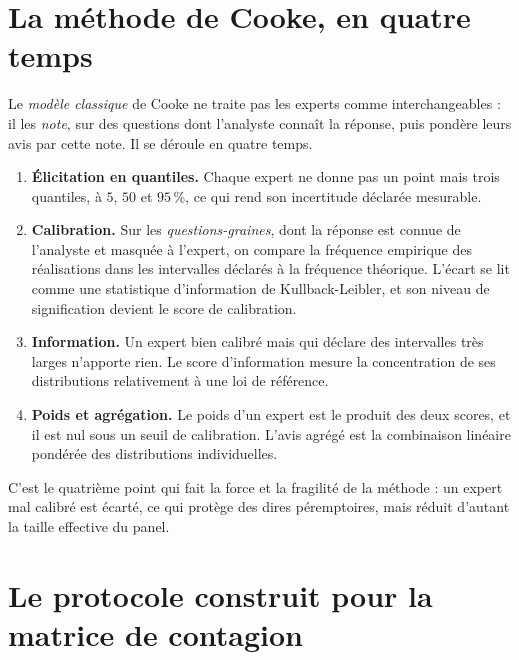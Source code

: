 \section{La méthode de Cooke, en quatre temps}


Le \emph{modèle classique} de Cooke ne traite pas les experts comme interchangeables : il les
\emph{note}, sur des questions dont l'analyste connaît la réponse, puis pondère leurs avis par
cette note. Il se déroule en quatre temps.

\begin{enumerate}[itemsep=3pt,topsep=3pt]
\item \textbf{Élicitation en quantiles.} Chaque expert ne donne pas un point mais trois
      quantiles, à $5$, $50$ et $95\,\%$, ce qui rend son incertitude déclarée mesurable.
\item \textbf{Calibration.} Sur les \emph{questions-graines}, dont la réponse est connue de
      l'analyste et masquée à l'expert, on compare la fréquence empirique des réalisations dans
      les intervalles déclarés à la fréquence théorique. L'écart se lit comme une statistique
      d'information de Kullback-Leibler, et son niveau de signification devient le
      score de calibration.
\item \textbf{Information.} Un expert bien calibré mais qui déclare des intervalles très larges
      n'apporte rien. Le score d'information mesure la concentration de ses
      distributions relativement à une loi de référence.
\item \textbf{Poids et agrégation.} Le poids d'un expert est le produit des deux scores, et il
      est nul sous un seuil de calibration. L'avis agrégé est la combinaison linéaire
      pondérée des distributions individuelles.
\end{enumerate}

C'est le quatrième point qui fait la force et la fragilité de la méthode : un expert mal
calibré est écarté, ce qui protège des dires péremptoires, mais réduit d'autant la taille
effective du panel.

\section{Le protocole construit pour la matrice de contagion}

